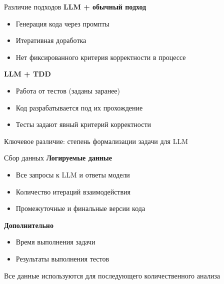 \documentclass[14pt,aspectratio=169]{beamer}
\begin{document}
\begin{frame}{Различие подходов}
\textbf{LLM + обычный подход}
\begin{itemize}
    \item Генерация кода через промпты
    \item Итеративная доработка
    \item Нет фиксированного критерия корректности в процессе
\end{itemize}

\vspace{0.5em}

\textbf{LLM + TDD}
\begin{itemize}
    \item Работа от тестов (заданы заранее)
    \item Код разрабатывается под их прохождение
    \item Тесты задают явный критерий корректности
\end{itemize}

\vspace{0.5em}

Ключевое различие: степень формализации задачи для LLM
\end{frame}

\begin{frame}{Сбор данных}
\textbf{Логируемые данные}
\begin{itemize}
    \item Все запросы к LLM и ответы модели
    \item Количество итераций взаимодействия
    \item Промежуточные и финальные версии кода
\end{itemize}

\vspace{0.5em}

\textbf{Дополнительно}
\begin{itemize}
    \item Время выполнения задачи
    \item Результаты выполнения тестов
\end{itemize}

\vspace{0.5em}

Все данные используются для последующего количественного анализа
\end{frame}
\end{document}
